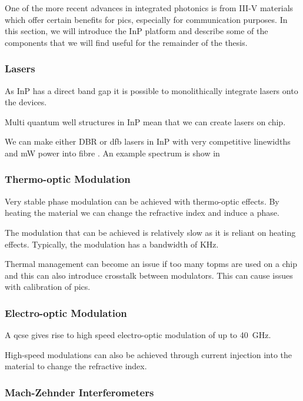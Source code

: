 One of the more recent advances in integrated photonics is from III-V materials which offer certain benefits for \acp{pic}, especially for communication purposes. In this section, we will introduce the \acl{InP} platform and describe some of the components that we will find useful for the remainder of the thesis.

\subsubsection*{Lasers}

As \ac{InP} has a direct band gap it is possible to monolithically integrate lasers onto the devices. 

Multi quantum well structures in \ac{InP} mean that we can create lasers on chip.

We can make either \ac{DBR} or \ac{dfb} lasers in \ac{InP} with very competitive linewidths and mW power into fibre \cite{jeppix}. An example spectrum is show in 

\subsubsection*{Thermo-optic Modulation}

Very stable phase modulation can be achieved with thermo-optic effects. By heating the material we can change the refractive index and induce a phase.

The modulation that can be achieved is relatively slow as it is reliant on heating effects. Typically, the modulation has a bandwidth of KHz. 

Thermal management can become an issue if too many \acp{topm} are used on a chip and this can also introduce crosstalk between modulators. This can cause issues with calibration of \acp{pic}.

\subsubsection*{Electro-optic Modulation}

A \ac{qcse} gives rise to high speed electro-optic modulation of up to \SI{40}{GHz}.

High-speed modulations can also be achieved through current injection into the material to change the refractive index. 

\subsubsection*{Mach-Zehnder Interferometers}

